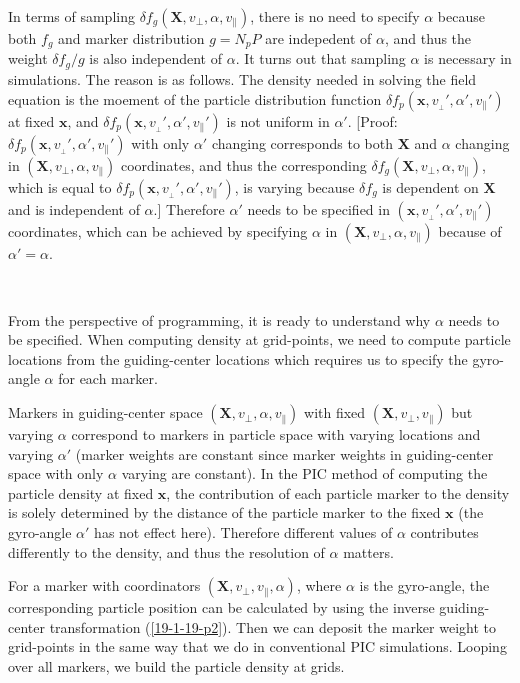 \documentclass{article}
\begin{document}
In terms of sampling $\delta f_g (\mathbf{X}, v_{\perp}, \alpha,
v_{\parallel})$, there is no need to specify $\alpha$ because both $f_g$ and
marker distribution $g = N_p P$ are indepedent of $\alpha$, and thus the
weight $\delta f_g / g$ is also independent of $\alpha$. It turns out that
sampling $\alpha$ is necessary in simulations. The reason is as follows. The
density needed in solving the field equation is the moement of the particle
distribution function $\delta f_p (\mathbf{x}, v_{_{\perp}}', \alpha',
v_{\parallel}')$ at fixed $\mathbf{x}$, and $\delta f_p (\mathbf{x},
v_{_{\perp}}', \alpha', v_{\parallel}')$ is not uniform in $\alpha'$. [Proof:
$\delta f_p (\mathbf{x}, v_{_{\perp}}', \alpha', v_{\parallel}')$ with only
$\alpha'$ changing corresponds to both $\mathbf{X}$ and $\alpha$ changing in
$(\mathbf{X}, v_{\perp}, \alpha, v_{\parallel})$ coordinates, and thus the
corresponding $\delta f_g (\mathbf{X}, v_{\perp}, \alpha, v_{\parallel})$,
which is equal to $\delta f_p (\mathbf{x}, v_{_{\perp}}', \alpha',
v_{\parallel}')$, is varying because $\delta f_g$ is dependent on $\mathbf{X}$
and is independent of $\alpha$.] Therefore $\alpha'$ needs to be specified in
$(\mathbf{x}, v_{_{\perp}}', \alpha', v_{\parallel}')$ coordinates, which can
be achieved by specifying $\alpha$ in $(\mathbf{X}, v_{\perp}, \alpha,
v_{\parallel})$ because of $\alpha' = \alpha$.

\

From the perspective of programming, it is ready to understand why $\alpha$
needs to be specified. When computing density at grid-points, we need to
compute particle locations from the guiding-center locations which requires us
to specify the gyro-angle $\alpha$ for each marker.

Markers in guiding-center space $(\mathbf{X}, v_{\perp}, \alpha,
v_{\parallel})$ with fixed $(\mathbf{X}, v_{\perp}, v_{\parallel})$ but
varying $\alpha$ correspond to markers in particle space with varying
locations and varying $\alpha'$ (marker weights are constant since marker
weights in guiding-center space with only $\alpha$ varying are constant). In
the PIC method of computing the particle density at fixed $\mathbf{x}$, the
contribution of each particle marker to the density is solely determined by
the distance of the particle marker to the fixed $\mathbf{x}$ (the gyro-angle
$\alpha'$ has not effect here). Therefore different values of $\alpha$
contributes differently to the density, and thus the resolution of $\alpha$
matters.

For a marker with coordinators $(\mathbf{X}, v_{\perp}, v_{\parallel},
\alpha)$, where $\alpha$ is the gyro-angle, the corresponding particle
position can be calculated by using the inverse guiding-center transformation
(\ref{19-1-19-p2}). Then we can deposit the marker weight to grid-points in
the same way that we do in conventional PIC simulations. Looping over all
markers, we build the particle density at grids.
\end{document}
